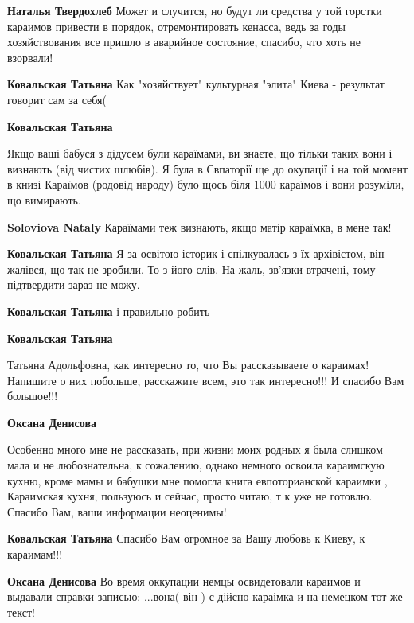 \begin{itemize}
\begin{itemize}
\begin{itemize} %
\textbf{Наталья Твердохлеб} Может и случится, но будут ли средства у той горстки караимов привести в порядок, отремонтировать кенасса, ведь за годы хозяйствования все пришло в аварийное состояние, спасибо, что хоть не взорвали!

\textbf{Ковальская Татьяна} Как "хозяйствует" культурная "элита" Киева - результат говорит сам за себя(
\end{itemize} %

\textbf{Ковальская Татьяна} 

Якщо ваші бабуся з дідусем були караїмами, ви знаєте, що тільки таких вони і
визнають (від чистих шлюбів). Я була в Євпаторії ще до окупації і на той момент
в книзі Караїмов (родовід народу) було щось біля 1000 караїмов і вони розуміли,
що вимирають.

\begin{itemize} %
\textbf{Soloviova Nataly} Караїмами теж визнають, якщо матір караїмка, в мене так!

\textbf{Ковальская Татьяна} Я за освітою історик і спілкувалась з їх архівістом, він жалівся, що так не зробили. То з його слів. На жаль, зв'язки втрачені, тому підтвердити зараз не можу.
\end{itemize} %

\textbf{Ковальская Татьяна} і правильно робить

\textbf{Ковальская Татьяна} 

Татьяна Адольфовна, как интересно то, что Вы рассказываете о караимах! Напишите
о них побольше, расскажите всем, это так интересно!!! И спасибо Вам большое!!!

\begin{itemize} %
\textbf{Оксана Денисова} 

Особенно много мне не рассказать, при жизни моих родных я была слишком мала и
не любознательна, к сожалению, однако немного освоила караимскую кухню, кроме
мамы и бабушки мне помогла книга евпоторианской караимки , Караимская кухня,
пользуюсь и сейчас, просто читаю, т к уже не готовлю. Спасибо Вам, ваши
информации неоценимы!


\textbf{Ковальская Татьяна} Спасибо Вам огромное за Вашу любовь к Киеву, к караимам!!!

\textbf{Оксана Денисова} Во время оккупации немцы освидетовали караимов и выдавали справки записью: ...вона( він ) є дійсно караімка и на немецком тот же текст!


\end{itemize}
\end{itemize}
\end{itemize}
